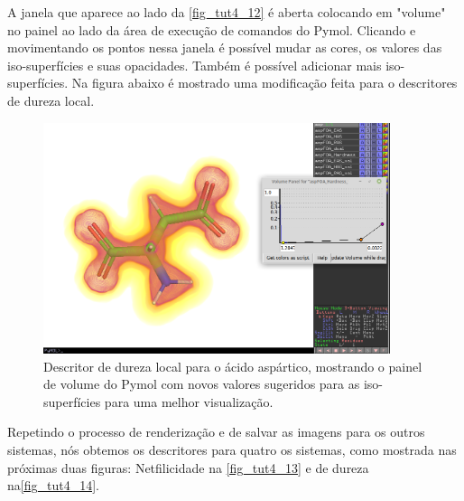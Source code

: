 \documentclass[a4paper,11pt]{refart}
\begin{document}
A janela que aparece ao lado da \autoref{fig_tut4_12} é aberta colocando em "volume" no painel ao lado da área de execução de comandos do Pymol. Clicando e movimentando os pontos nessa janela é possível mudar as cores, os valores das iso-superfícies e suas opacidades. Também é possível adicionar mais iso-superfícies. Na figura abaixo é mostrado uma modificação feita para o descritores de dureza local. 


\hspace*{-\leftmarginwidth}
\begin{minipage}{\fullwidth}
	\begin{figure}[H]
		\begin{center}
			\includegraphics[width=4in]{images/tut4_img14}
			\caption{Descritor de dureza local para o ácido aspártico, mostrando o painel de volume do Pymol com novos valores sugeridos para as iso-superfícies para uma melhor visualização.}
			\label{fig_tut4_12}
		\end{center}
	\end{figure}
\end{minipage}

Repetindo o processo de renderização e de salvar as imagens para os outros sistemas, nós obtemos os descritores para quatro os sistemas, como mostrada nas próximas duas figuras: Netfilicidade na \autoref{fig_tut4_13} e de dureza na\autoref{fig_tut4_14}.
\end{document}
